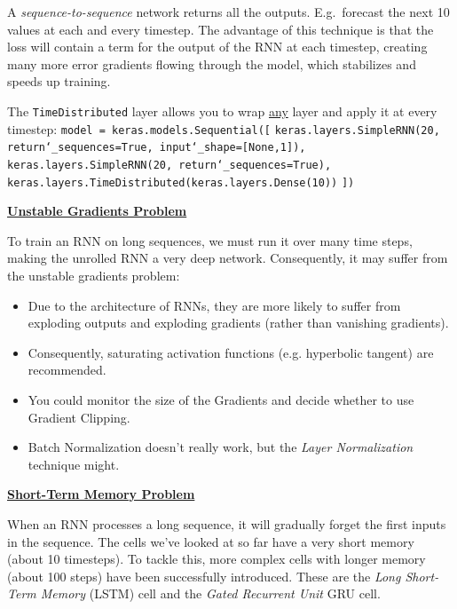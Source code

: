 A \textit{sequence-to-sequence} network returns all the outputs.\newline
E.g.~forecast the next 10 values at each and every timestep.
The advantage of this technique is that the loss will contain a term for the output of the RNN at each timestep,
creating many more error gradients flowing through the model,
which stabilizes and speeds up training.

The \texttt{TimeDistributed} layer allows you to wrap \underline{any} layer and apply it at every timestep:\newline
\texttt{model = keras.models.Sequential([}\newline
\texttt{keras.layers.SimpleRNN(20, return\char`_sequences=True, input\char`_shape=[None,1]),}\newline
\texttt{keras.layers.SimpleRNN(20, return\char`_sequences=True),}\newline
\texttt{keras.layers.TimeDistributed(keras.layers.Dense(10))}\newline
\texttt{])}

\textbf{\underline{Unstable Gradients Problem}}

To train an RNN on long sequences, we must run it over many time steps, making the unrolled RNN a very deep network.    
Consequently, it may suffer from the unstable gradients problem:

\vspace{-3.5mm}
\begin{itemize}
\item
Due to the architecture of RNNs, they are more likely to suffer from exploding outputs and exploding gradients (rather than vanishing gradients).
\item
\vspace{-2.0mm}
Consequently, saturating activation functions (e.g. hyperbolic tangent) are recommended.
\item
\vspace{-2.0mm}
You could monitor the size of the Gradients and decide whether to use Gradient Clipping.
\item
\vspace{-2.0mm}
Batch Normalization doesn't really work, but the \textit{Layer Normalization} technique might.
\end{itemize}


\textbf{\underline{Short-Term Memory Problem}}

When an RNN processes a long sequence, it will gradually forget the first inputs in the sequence.
The cells we've looked at so far have a very short memory (about 10 timesteps).
To tackle this, more complex cells with longer memory (about 100 steps) have been successfully introduced.
These are the \textit{Long Short-Term Memory} (LSTM) cell and the \textit{Gated Recurrent Unit} GRU cell.

